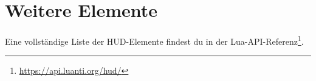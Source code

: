 \begin{Shaded}
\begin{Highlighting}[]

\OperatorTok{(}\OperatorTok{)}

\OperatorTok{(}\OperatorTok{(}\OperatorTok{)}
    \OperatorTok{[}\OperatorTok{:}\OperatorTok{()]} \OperatorTok{=} 
\OperatorTok{)}
\end{Highlighting}
\end{Shaded}

\section{Weitere Elemente}\label{weitere-elemente}

Eine vollständige Liste der HUD-Elemente findest du in der
Lua-API-Referenz\footnote{\url{https://api.luanti.org/hud/}}.
